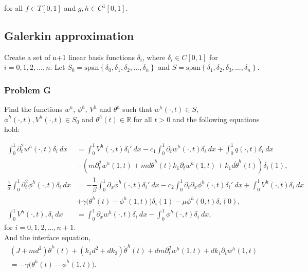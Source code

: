 \documentclass[../../main.tex]{subfiles}
\begin{document}
for all $f \in T[0,1]$ and $g,h \in C^1[0,1]$.\\




\subsection{Galerkin approximation}
Create a set of n+1 linear basis functions $\delta_i$, where $\delta_i \in C[0,1]$ for $i = 0,1,2,...,n$. Let $S_0 = \textrm{span}\left\{\delta_0,\delta_1,\delta_2,...,\delta_n\right\}$ and $S = \textrm{span}\left\{\delta_1,\delta_2,\delta_3,...,\delta_n\right\}$. 


\subsubsection{Problem G}
Find the functions $w^h$, $\phi^h$, $V^h$ and $\theta^h$ such that $w^h(\cdot,t) \in S$,  $\phi^h(\cdot,t),V^h(\cdot,t) \in S_0$ and $\theta^h(t) \in \mathbb{R}$ for all $t>0$ and the following equations hold:

\begin{align}
\int_0^1 \partial^2_t w^h(\cdot,t) \delta_i \ dx & =   \int_0^1 V^h(\cdot,t) \delta_i' \ dx - c_1 \int_0^1 \partial_t w^h(\cdot,t) \delta_i \ dx + \int_0^1 q(\cdot,t) \delta_i \ dx \nonumber \\
 & -(m \partial_t^2 w^h(1,t) +  md \ddot \theta^h(t)k_1 \partial_t w^h(1,t) + k_1 d \dot \theta^h(t))\delta_i(1), \\
\frac{1}{\alpha} \int_0^1 \partial^2_t \phi^h(\cdot,t) \delta_i \ dx & = -\dfrac{1}{\beta}\int_0^1\partial_x \phi^h(\cdot,t)\delta_i' \ dx - c_2 \int_0^1 \partial_t \partial_x \phi^h(\cdot,t) \delta_i' \ dx + \int_0^1 V^h(\cdot,t) \delta_i \ dx \nonumber \\
 & +\gamma \big(\theta^h(t) - \phi^h(1,t)\big)\delta_i(1) - \mu \phi^h(0,t)\delta_i(0),\\
\int_0^1 V^h(\cdot,t),\delta_i \ dx &= \int_0^1 \partial_x w^h(\cdot,t) \delta_i \ dx -  \int_0^1 \phi^h(\cdot,t) \delta_i \ dx, 
\end{align}
for $i = 0,1,2,...,n+1$.\\

And the interface equation,
\begin{align}
(J+ md^2) \ddot \theta^h(t)+ (k_1 d^2 + d k_2) \dot \theta^h(t)  + dm \partial_t^2 w^h(1,t)
  + dk_1 \partial_t w^h(1,t) \nonumber\\
  =  -\gamma \big(\theta^h(t) - \phi^h(1,t)\big).
\end{align}
\end{document}
